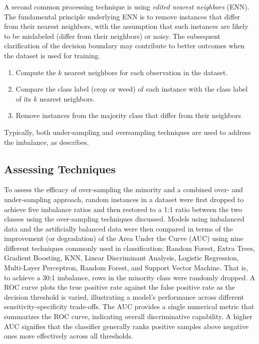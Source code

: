 \documentclass[letterpaper, notitlepage]{report}
\begin{document}
A second common processing technique is using \textit{edited nearest neighbors} (ENN). The fundamental principle underlying ENN is to remove instances that differ from their nearest neighbors, with the assumption that such instances are likely to be mislabeled (differ from their neighbors) or noisy. The subsequent clarification of the decision boundary may contribute to better outcomes when the dataset is used for training.
\begin{enumerate}
\item{Compute the $k$ nearest neighbors for each observation in the dataset.}
\item{Compare the class label (crop or weed) of each instance with the class label of its $k$ nearest neighbors.}
\item{Remove instances from the majority class that differ from their neighbors}
\end{enumerate}

Typically, both under-sampling and oversampling techniques are used to address the imbalance, as \citeauthor{Batista2004-qz} \citeyear{Batista2004-qz} describes. 

\subsection{Assessing Techniques}
To assess the efficacy of over-sampling the minority and a combined over- and under-sampling approach, random instances in a dataset were first dropped to achieve five imbalance ratios and then restored to a 1:1 ratio between the two classes using the over-sampling techniques discussed. Models using imbalanced data and the artificially balanced data were then compared in terms of the improvement (or degradation) of the Area Under the Curve (AUC) using nine different techniques commonly used in classification: Random Forest, Extra Trees, Gradient Boosting, KNN, Linear Discriminant Analysis, Logistic Regression, Multi-Layer Perceptron, Random Forest, and Support Vector Machine. That is, to achieve a 30:1 imbalance, rows in the minority class were randomly dropped. A \gls{ROC} curve plots the true positive rate against the false positive rate as the decision threshold is varied, illustrating a model’s performance across different sensitivity-specificity trade-offs. The \gls{AUC} provides a single numerical metric that summarizes the ROC curve, indicating overall discriminative capability. A higher AUC signifies that the classifier generally ranks positive samples above negative ones more effectively across all thresholds.
\end{document}

